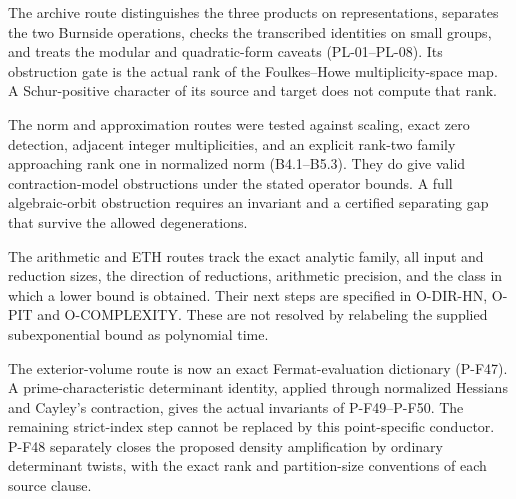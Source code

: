 The archive route distinguishes the three products on representations,
separates the two Burnside operations, checks the transcribed identities
on small groups, and treats the modular and quadratic-form caveats
(PL-01--PL-08). Its obstruction gate is the actual rank of the
Foulkes--Howe multiplicity-space map. A Schur-positive character of its
source and target does not compute that rank.

The norm and approximation routes were tested against scaling, exact
zero detection, adjacent integer multiplicities, and an explicit rank-two
family approaching rank one in normalized norm (B4.1--B5.3). They do give
valid contraction-model obstructions under the stated operator bounds.
A full algebraic-orbit obstruction requires an invariant and a certified
separating gap that survive the allowed degenerations.

The arithmetic and ETH routes track the exact analytic family, all input
and reduction sizes, the direction of reductions, arithmetic precision,
and the class in which a lower bound is obtained. Their next steps are
specified in O-DIR-HN, O-PIT and O-COMPLEXITY. These are not resolved by
relabeling the supplied subexponential bound as polynomial time.

The exterior-volume route is now an exact Fermat-evaluation
dictionary (P-F47). A prime-characteristic determinant identity,
applied through normalized Hessians and Cayley's contraction,
gives the actual invariants of P-F49--P-F50. The remaining
strict-index step cannot be replaced by this point-specific
conductor. P-F48 separately closes the proposed density
amplification by ordinary determinant twists, with the exact
rank and partition-size conventions of each source clause.
